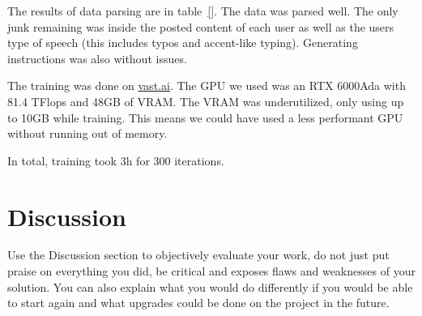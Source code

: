 \documentclass[fleqn,moreauthors,10pt]{ds_report}
\begin{document}
The results of data parsing are in table~\ref{}. The data was parsed well. The only junk remaining was inside the posted content of each user as well as the users type of speech (this includes typos and accent-like typing). Generating instructions was also without issues.

The training was done on \href{https://cloud.vast.ai/create/}{vast.ai}. The GPU we used was an RTX 6000Ada with 81.4 TFlops and 48GB of VRAM. The VRAM was underutilized, only using up to 10GB while training. This means we could have used a less performant GPU without running out of memory.

In total, training took 3h for 300 iterations.

\section*{Discussion}

Use the Discussion section to objectively evaluate your work, do not just put praise on everything you did, be critical and exposes flaws and weaknesses of your solution. You can also explain what you would do differently if you would be able to start again and what upgrades could be done on the project in the future.

\end{document}
